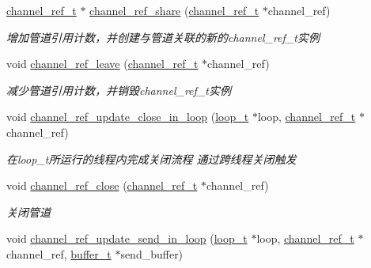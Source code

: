 \begin{DoxyCompactItemize}
\hyperlink{a00044_a151271c9d188ef28d4d24bb81dcc1263_a151271c9d188ef28d4d24bb81dcc1263}{channel\+\_\+ref\+\_\+t} $\ast$ \hyperlink{a00084_ga7b76c4078bbe8272206a5d7467ccd4ed_ga7b76c4078bbe8272206a5d7467ccd4ed}{channel\+\_\+ref\+\_\+share} (\hyperlink{a00044_a151271c9d188ef28d4d24bb81dcc1263_a151271c9d188ef28d4d24bb81dcc1263}{channel\+\_\+ref\+\_\+t} $\ast$channel\+\_\+ref)
\begin{DoxyCompactList}\small\item\em 增加管道引用计数，并创建与管道关联的新的channel\+\_\+ref\+\_\+t实例 \end{DoxyCompactList}\item 
void \hyperlink{a00084_gab4248c6e10ac538b5d37b927bbe39ef1_gab4248c6e10ac538b5d37b927bbe39ef1}{channel\+\_\+ref\+\_\+leave} (\hyperlink{a00044_a151271c9d188ef28d4d24bb81dcc1263_a151271c9d188ef28d4d24bb81dcc1263}{channel\+\_\+ref\+\_\+t} $\ast$channel\+\_\+ref)
\begin{DoxyCompactList}\small\item\em 减少管道引用计数，并销毁channel\+\_\+ref\+\_\+t实例 \end{DoxyCompactList}\item 
void \hyperlink{a00041_acd7537431cf488ed39e782e63f79d997_acd7537431cf488ed39e782e63f79d997}{channel\+\_\+ref\+\_\+update\+\_\+close\+\_\+in\+\_\+loop} (\hyperlink{a00044_a9c3ad1cd2de83e09f3a7b59fa82c94ee_a9c3ad1cd2de83e09f3a7b59fa82c94ee}{loop\+\_\+t} $\ast$loop, \hyperlink{a00044_a151271c9d188ef28d4d24bb81dcc1263_a151271c9d188ef28d4d24bb81dcc1263}{channel\+\_\+ref\+\_\+t} $\ast$channel\+\_\+ref)
\begin{DoxyCompactList}\small\item\em 在loop\+\_\+t所运行的线程内完成关闭流程 通过跨线程关闭触发 \end{DoxyCompactList}\item 
void \hyperlink{a00084_ga49d6ba5f0b9aad95ae5c5710dca392a1_ga49d6ba5f0b9aad95ae5c5710dca392a1}{channel\+\_\+ref\+\_\+close} (\hyperlink{a00044_a151271c9d188ef28d4d24bb81dcc1263_a151271c9d188ef28d4d24bb81dcc1263}{channel\+\_\+ref\+\_\+t} $\ast$channel\+\_\+ref)
\begin{DoxyCompactList}\small\item\em 关闭管道 \end{DoxyCompactList}\item 
void \hyperlink{a00041_ab2afcbb2288d9654f7eb656a8c242167_ab2afcbb2288d9654f7eb656a8c242167}{channel\+\_\+ref\+\_\+update\+\_\+send\+\_\+in\+\_\+loop} (\hyperlink{a00044_a9c3ad1cd2de83e09f3a7b59fa82c94ee_a9c3ad1cd2de83e09f3a7b59fa82c94ee}{loop\+\_\+t} $\ast$loop, \hyperlink{a00044_a151271c9d188ef28d4d24bb81dcc1263_a151271c9d188ef28d4d24bb81dcc1263}{channel\+\_\+ref\+\_\+t} $\ast$channel\+\_\+ref, \hyperlink{a00044_aad99a77d28bd81d3d36d0ea569c9482d_aad99a77d28bd81d3d36d0ea569c9482d}{buffer\+\_\+t} $\ast$send\+\_\+buffer)

\end{DoxyCompactItemize}
